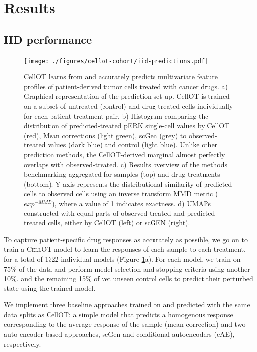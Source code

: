 \section{Results}

\subsection{IID performance}

\begin{figure}[hp!]
  \begin{center}
    \texttt{[image: ./figures/cellot-cohort/iid-predictions.pdf]}
  \end{center}
  \caption{CellOT learns from and accurately predicts multivariate feature profiles of patient-derived tumor cells treated with cancer drugs.
  a) Graphical representation of the prediction set-up. CellOT is trained on a subset of untreated (control) and drug-treated cells individually for each patient treatment pair. 
  b) Histogram comparing the distribution of predicted-treated pERK single-cell values by CellOT (red), Mean corrections (light green), scGen (grey) to observed-treated values (dark blue) and control (light blue). Unlike other prediction methods, the CellOT-derived marginal almost perfectly overlaps with observed-treated.
  c) Results overview of the methods benchmarking aggregated for samples (top) and drug treatments (bottom). Y axis represents the distributional similarity of  predicted cells to observed cells using an inverse transform MMD metric ($exp^{-MMD}$), where a value of 1 indicates exactness. 
d) UMAPs constructed with equal parts of observed-treated and predicted-treated cells, either by CellOT (left) or scGEN (right).}
  \label{fig:iid-prediction}
\end{figure}

To capture patient-specific drug responses as accurately as possible, we go on to train a \textsc{CellOT} model to learn the responses of each sample to each treatment, for a total of 1322 individual models (Figure \ref{fig:iid-prediction}a).
For each model, we train on 75\% of the data and perform model selection and stopping criteria using another 10\%,
and the remaining 15\% of yet unseen control cells to predict their perturbed state using the trained model.

We implement three baseline approaches trained on and predicted with the same data splits as CellOT: a simple model that predicts a homogenous response corresponding to the average response of the sample (mean correction) and two auto-encoder based approaches, scGen \cite{need} and conditional autoencoders \cite{need} (cAE), respectively. 

